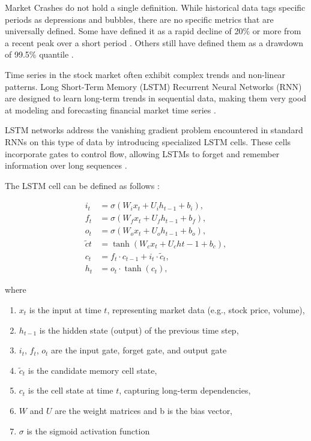 \documentclass[12pt, letterpaper]{article}
\begin{document}
    Market Crashes do not hold a single definition. While historical data tags specific periods as depressions and bubbles, there are no specific metrics that are universally defined. Some have defined it as a rapid decline of 20\% or more from a recent peak over a short period \cite{Fonville, Investo}. Others still have defined them as a drawdown of 99.5\% quantile \cite{99.5quantile}.
    \newline
    
    Time series in the stock market often exhibit complex trends and non-linear patterns. 
    Long Short-Term Memory (LSTM) Recurrent Neural Networks (RNN) are designed to learn long-term trends in sequential data, making them very good at modeling and forecasting financial market time series \cite{hochreiter1997, greff2017}.

    LSTM networks address the vanishing gradient problem encountered in standard RNNs on this type of data by introducing specialized LSTM cells. These cells incorporate gates to control flow, allowing LSTMs to forget and remember information over long sequences \cite{hochreiter1997}.

    The LSTM cell can be defined as follows \cite{hochreiter1997}:

\begin{align*} 
    i_t &= \sigma(W_i x_t + U_i h_{t-1} + b_i), \\ f_t &= \sigma(W_f x_t + U_f h_{t-1} + b_f), \\ o_t &= \sigma(W_o x_t + U_o h_{t-1} + b_o), \\ \tilde{c}t &= \tanh(W_c x_t + U_c h{t-1} + b_c), \\ c_t &= f_t \cdot c_{t-1} + i_t \cdot \tilde{c}_t, \\ h_t &= o_t \cdot \tanh(c_t), 
\end{align*}

where

\begin{enumerate}[label=-]
    \item $x_t$ is the input at time $t$, representing market data (e.g., stock price, volume),
    \item $h_{t-1}$ is the hidden state (output) of the previous time step,
    \item $i_t$, $f_t$, $o_t$ are the input gate, forget gate, and output gate
    \item $\tilde{c}_t$ is the candidate memory cell state,
    \item $c_t$ is the cell state at time $t$, capturing long-term dependencies,
    \item $W$ and $U$ are the weight matrices and b is the bias vector,
    \item $\sigma$ is the sigmoid activation function
\end{enumerate}
\end{document}
